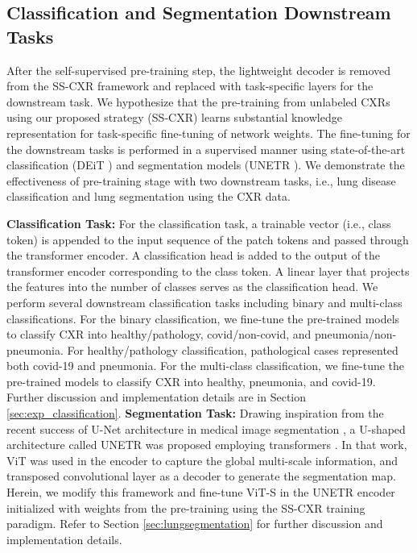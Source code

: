 \documentclass[10pt,journal,compsoc]{IEEEtran}
\begin{document}
\subsection{Classification and Segmentation Downstream Tasks}
\label{sec:downstream}
 
 After the self-supervised pre-training step, the lightweight decoder is removed from the SS-CXR framework and replaced with task-specific layers for the downstream task. We hypothesize that the pre-training from unlabeled CXRs using our proposed strategy (SS-CXR) learns substantial knowledge representation for task-specific fine-tuning of network weights. The fine-tuning for the downstream tasks is performed in a supervised manner using state-of-the-art classification (DEiT \cite{pmlr-v139-touvron21a}) and segmentation models (UNETR \cite{unetr}). We demonstrate the effectiveness of pre-training stage with two downstream tasks, i.e., lung disease classification and lung segmentation using the CXR data. 

\noindent \textbf{Classification Task:}
For the classification task, a trainable vector (i.e., class token) is appended to the input sequence of the patch tokens and passed through the transformer encoder. A classification head is added to the output of the transformer encoder corresponding to the class token.  A linear layer that projects the features into the number of classes serves as the classification head.  
We perform several downstream classification tasks including binary and multi-class classifications. For the binary classification, we fine-tune the pre-trained models to classify CXR into healthy/pathology, covid/non-covid, and pneumonia/non-pneumonia. For healthy/pathology classification, pathological cases represented both covid-19 and pneumonia. For the multi-class classification, we fine-tune the pre-trained models to classify CXR into healthy, pneumonia, and covid-19. Further discussion and implementation details are in Section \ref{sec:exp_classification}.
\noindent \textbf{Segmentation Task:}
Drawing inspiration from the recent success of U-Net architecture in medical image segmentation \cite{unet}, a U-shaped architecture called UNETR was proposed employing transformers \cite{unetr}. In that work, ViT was used in the encoder to capture the global multi-scale information, and transposed convolutional layer as a decoder to generate the segmentation map. Herein, we modify this framework and fine-tune ViT-S in the UNETR encoder initialized with weights from the pre-training using the SS-CXR training paradigm. Refer to Section \ref{sec:lungsegmentation} for further discussion and implementation details.
\end{document}
